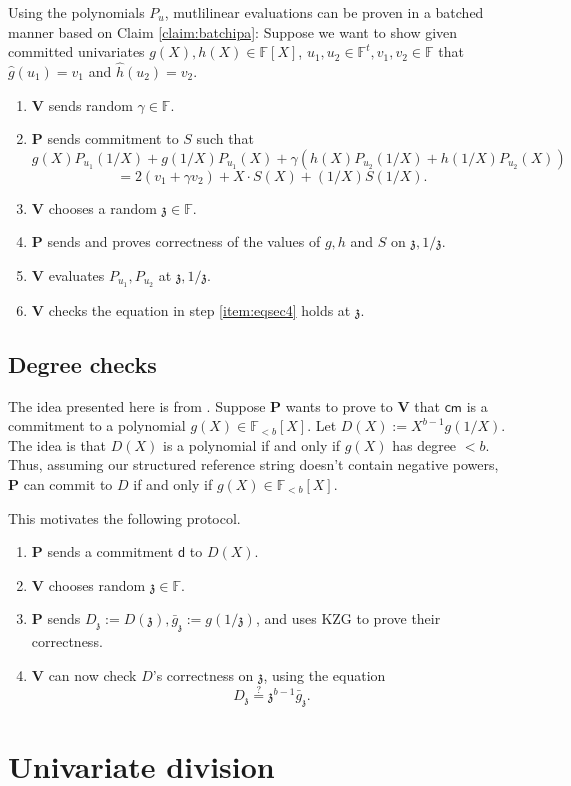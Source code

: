 \documentclass[11pt]{article} %
\newcommand{\F}{\ensuremath{\mathbb F}\xspace}
\newcommand{\cm}{\ensuremath{\mathsf{cm}}\xspace}
\newcommand{\defeq}{:=}
\newcommand{\prv}{\ensuremath{\mathsf{\mathbf{P}}}\xspace}
\newcommand{\ver}{\ensuremath{\mathsf{\mathbf{V}}}\xspace}
\newcommand{\polysofdeg}[1]{\ensuremath{\F_{< #1}[X]}\xspace}
\newcommand{\polys}{\ensuremath{\F[X]}\xspace}
\renewcommand{\d}{\ensuremath{\mathsf{d}}\xspace}
\newcommand{\eqpol}[1]{\ensuremath{P_{#1}}\xspace}
\newcommand{\mle}[1]{\ensuremath{\hat{#1}}\xspace}
\renewcommand{\zeta}{\mathfrak{z}}
\newcommand{\dzeta}{\ensuremath{D_{\zeta}}\xspace}
\newcommand{\ginv}{\ensuremath{\bar{g}_{\zeta}}\xspace}
\begin{document}
Using the polynomials \eqpol{u}, mutlilinear evaluations can be proven in a batched manner based on Claim \ref{claim:batchipa}:
Suppose we want to show given committed univariates $g(X),h(X)  \in\polys$, $u_1,u_2\in \F^t,v_1,v_2\in \F$ that
$\mle{g}(u_1)=v_1$ and $\mle{h}(u_2)=v_2$.
\begin{enumerate}
 \item \ver sends random $\gamma\in \F$.
 \item\label{item:eqsec4} \prv sends commitment to $S$ such that
\[ g(X)P_{u_1}(1/X)+ g(1/X) P_{u_1}(X) + \gamma(h(X)P_{u_2}(1/X) + h(1/X)P_{u_2}(X))\]
\[= 2(v_1+\gamma v_2) + X\cdot S(X)+(1/X)S(1/X).\]
\item \ver chooses a random $\zeta\in \F$.
\item \prv sends and proves correctness of the values of $g,h$ and $S$ on $\zeta,1/\zeta$. 
\item \ver evaluates $P_{u_1},P_{u_2}$ at $\zeta,1/\zeta$. 
\item \ver checks the equation in step \ref{item:eqsec4} holds at $\zeta$.
\end{enumerate}

\subsection{Degree checks}
The idea presented here is from \cite{thakur}.
Suppose \prv wants to prove to \ver that \cm is a commitment to a polynomial $g(X)\in \polysofdeg{b}$.
Let $D(X)\defeq  X^{b-1} g(1/X)$. The idea is that $D(X)$ is a polynomial if and only if $g(X)$ has degree $<b$.
Thus, assuming our structured reference string  doesn't contain negative powers, \prv can commit to $D$ if
and only if $g(X)\in \polysofdeg{b}$.

This motivates the following protocol.
\begin{enumerate}
 \item 
\prv sends a commitment \d to $D(X)$.
\item \ver chooses random $\zeta \in \F$.
\item \prv sends $\dzeta \defeq D(\zeta), \ginv \defeq  g(1/\zeta)$, and uses KZG to prove their correctness.
\item \ver can now check $D$'s correctness on   $\zeta$, using the equation
\[\dzeta \stackrel{?}{=}\zeta^{b-1} \ginv.\]

\end{enumerate}

\section{Univariate division}
\end{document}
